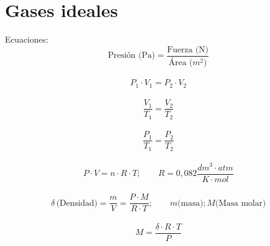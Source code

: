 \documentclass[../teoria.root.tex]{subfiles}
\begin{document}
\section{Gases ideales}
Ecuaciones:
$$ \text{Presión (Pa)} = \frac{\text{Fuerza (N)}}{\text{Área ($m^2$)}} $$
\\
$$ P_1 \cdot V_1 = P_2 \cdot V_2 $$
\\
$$ \frac{V_1}{T_1}=\frac{V_2}{T_2} $$
\\
$$ \frac{P_1}{T_1}=\frac{P_2}{T_2} $$
\\
$$ P\cdot V=n\cdot R\cdot T;\qquad R = 0,082 \frac{dm^3\cdot atm}{K\cdot mol} $$
\\
$$ \delta\,\text{(Densidad)} = \frac{m}{V} = \frac{P\cdot M}{R\cdot T}; \qquad m \text{(masa)}; M \text{(Masa molar)} $$
\\
$$ M=\frac{\delta\cdot R\cdot T}{P} $$
\end{document}
